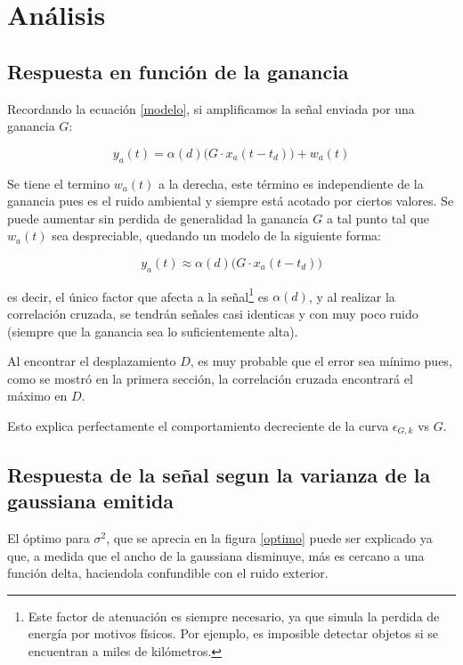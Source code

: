 \documentclass[letterpaper,11pt]{article}
\begin{document}
\section{Análisis}

\subsection{Respuesta en función de la ganancia}

Recordando la ecuación \eqref{modelo}, si amplificamos la señal enviada por una ganancia $G$:

\begin{equation}
y_{a}(t) =\alpha(d) \big(G \cdot x_{a}(t-t_{d})\big) + w_{a}(t)
\end{equation}

Se tiene el termino $w_{a}(t)$ a la derecha, este término es independiente de la ganancia pues es el ruido ambiental y siempre está acotado por ciertos valores. Se puede aumentar sin perdida de generalidad la ganancia $G$ a tal punto tal que $w_{a}(t)$ sea despreciable, quedando un modelo de la siguiente forma:

\begin{equation}
y_{a}(t) \approx \alpha(d) \big(G \cdot x_{a}(t-t_{d})\big)
\end{equation}

es decir, el único factor que afecta a la señal\footnote{Este factor de atenuación es siempre necesario, ya que simula la perdida de energía por motivos físicos. Por ejemplo, es imposible detectar objetos si se encuentran a miles de kilómetros.} es $\alpha(d)$, y al realizar la correlación cruzada, se tendrán señales casi identicas y con muy poco ruido (siempre que la ganancia sea lo suficientemente alta).\par

Al encontrar el desplazamiento $D$, es muy probable que el error sea mínimo pues, como se mostró en la primera sección, la correlación cruzada encontrará el máximo en $D$.

Esto explica perfectamente el comportamiento decreciente de la curva $\epsilon_{G,k}$ vs $G$.

\subsection{Respuesta de la señal segun la varianza de la gaussiana emitida}

El óptimo para $\sigma^2$, que se aprecia en la figura \ref{optimo} puede ser explicado ya que, a medida que el ancho de la gaussiana disminuye, más es cercano a una función delta, haciendola confundible con el ruido exterior. \par
\end{document}
